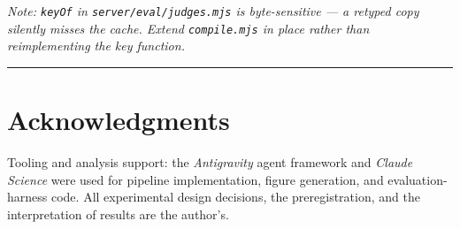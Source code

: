 \documentclass[11pt]{article}
\begin{document}
\emph{Note: \texttt{keyOf} in \texttt{server/eval/judges.mjs} is
byte-sensitive --- a retyped copy silently misses the cache. Extend
\texttt{compile.mjs} in place rather than reimplementing the key
function.}

\begin{center}\rule{0.5\linewidth}{0.5pt}\end{center}


\section{Acknowledgments}
Tooling and analysis support: the \emph{Antigravity} agent framework and
\emph{Claude Science} were used for pipeline implementation, figure
generation, and evaluation-harness code. All experimental design
decisions, the preregistration, and the interpretation of results are
the author's.
\end{document}
